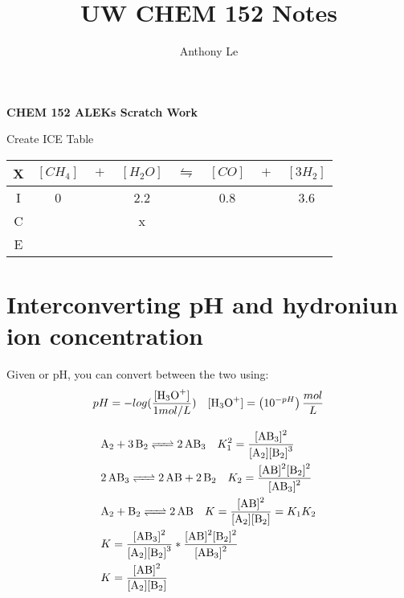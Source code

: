 \documentclass{article}  %
\title{UW CHEM 152 Notes}
\author{Anthony Le}
\begin{document}
\pagestyle{fancy}
\fancyhead{}

\begin{center}
    \LARGE{\textbf{CHEM 152 ALEKs Scratch Work}}
\end{center}

Create ICE Table \\
\begin{tabular}{c|c@{}c@{}c@{}c@{}c@{}c@{}c}
    \hline
    X   & $[CH_4]$ & ${}+{}$ & $[H_2O]$ & ${}\leftrightharpoons{}$ & $[CO]$ & ${}+{}$ & $[3H_2]$ \\
    \hline
    I   &  0    && 2.2    &&  0.8   && 3.6  \\
    C   &      &&  x   &&     &&   \\
    E   &      &&     &&     &&   \\      
\end{tabular}
 

\section*{Interconverting pH and hydroniun ion concentration}
Given \ce{[H3O^+]} or pH, you can convert between the two using:
\begin{equation*}
    \begin{aligned}
        pH = - log(\frac{\ce{[H3O^+]}}{1 mol/L}) \quad \ce{[H3O^+]} = \left(10^{-pH}\right) \frac{mol}{L}
    \end{aligned}
\end{equation*}


\begin{equation*}
    \begin{aligned}
        &\ce{A2 + 3 B2 <=> 2 AB_3} \quad K_1^2 = \ce{\frac{[AB3]^2}{[A2][B2]^3}} \\
        &\ce{2AB3 <=> 2AB + 2B2} \quad K_2 = \ce{\frac{[AB]^2[B2]^2}{[AB3]^2}} \\
        &\ce{A2 + B2 <=> 2 AB} \quad K = \ce{\frac{[AB]^2}{[A2][B2]}} = K_1K_2 \\
        &K = \ce{\frac{[AB3]^2}{[A2][B2]^3}} * \ce{\frac{[AB]^2[B2]^2}{[AB3]^2}} \\
        &K = \ce{\frac{[AB]^2}{[A2][B2]}}
    \end{aligned}
\end{equation*}
\end{document}
